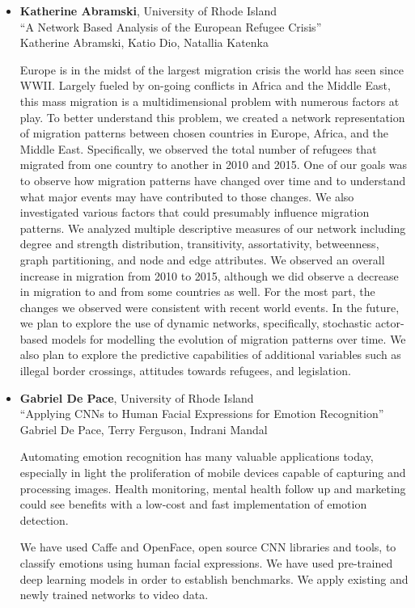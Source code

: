 \begin{itemize}
\item \textbf{Katherine Abramski}, University of Rhode Island \\
``A Network Based Analysis of the European Refugee Crisis'' \\
Katherine Abramski, Katio Dio, Natallia Katenka


Europe is in the midst of the largest migration crisis the world has seen since WWII. Largely fueled by on-going conflicts in Africa and the Middle East, this mass migration is a multidimensional problem with numerous factors at play. To better understand this problem, we created a network representation of migration patterns between chosen countries in Europe, Africa, and the Middle East. Specifically, we observed the total number of refugees that migrated from one country to another in 2010 and 2015. One of our goals was to observe how migration patterns have changed over time and to understand what major events may have contributed to those changes. We also investigated various factors that could presumably influence migration patterns. We analyzed multiple descriptive measures of our network including degree and strength distribution, transitivity, assortativity, betweenness, graph partitioning, and node and edge attributes. We observed an overall increase in migration from 2010 to 2015, although we did observe a decrease in migration to and from some countries as well. For the most part, the changes we observed were consistent with recent world events. In the future, we plan to explore the use of dynamic networks, specifically, stochastic actor-based models for modelling the evolution of migration patterns over time. We also plan to explore the predictive capabilities of additional variables such as illegal border crossings, attitudes towards refugees, and legislation.

\item \textbf{Gabriel De Pace}, University of Rhode Island \\
``Applying CNNs to Human Facial Expressions for Emotion Recognition'' \\
Gabriel De Pace, Terry Ferguson, Indrani Mandal


Automating emotion recognition has many valuable applications today, especially in light the proliferation of mobile devices capable of capturing and processing images. Health monitoring, mental health follow up and marketing could see benefits with a low-cost and fast implementation of emotion detection.

We have used Caffe and OpenFace, open source CNN libraries and tools, to classify emotions using human facial expressions. We have used pre-trained deep learning models in order to establish benchmarks.  We apply existing and newly trained networks to video data.


\end{itemize}

